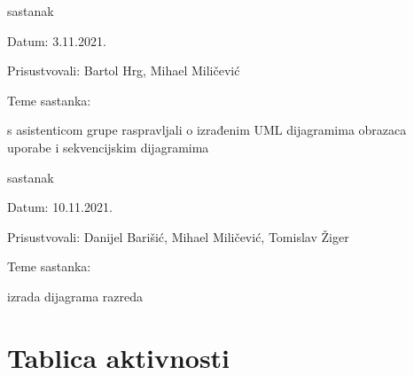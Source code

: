 \begin{packed_enum}
			\item  sastanak
			\item[] \begin{packed_item}
				\item Datum: 3.11.2021.
				\item Prisustvovali: Bartol Hrg, Mihael Miličević
				\item Teme sastanka:
				\begin{packed_item}
					\item  s asistenticom grupe raspravljali o izrađenim UML dijagramima obrazaca uporabe i sekvencijskim dijagramima
				\end{packed_item}
			\end{packed_item}
			
			\item  sastanak
			\item[] \begin{packed_item}
				\item Datum: 10.11.2021.
				\item Prisustvovali: Danijel Barišić, Mihael Miličević, Tomislav Žiger
				\item Teme sastanka:
				\begin{packed_item}
					\item  izrada dijagrama razreda
				\end{packed_item}
			\end{packed_item}
			
			
		\end{packed_enum}
		
		\eject
		\section*{Tablica aktivnosti}
		


